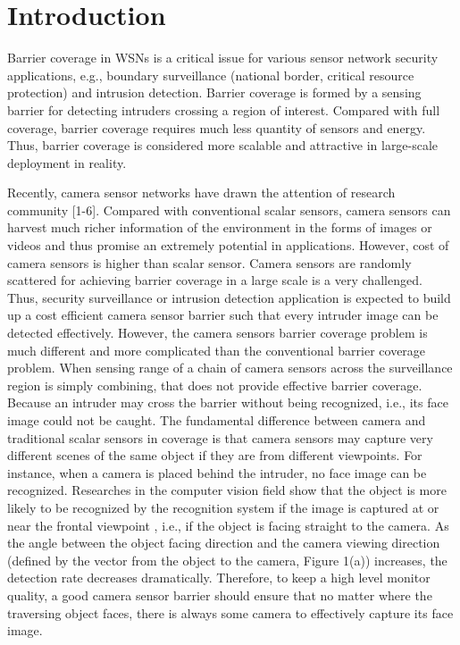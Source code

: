 \documentclass[3p]{elsarticle}
\begin{document}
\section{Introduction}
\label{sec:intro}
Barrier coverage in WSNs is a critical issue for various sensor network security applications, e.g., boundary surveillance (national border, critical resource protection) and intrusion detection. Barrier coverage is formed by a sensing barrier for detecting intruders crossing a region of interest. Compared with full coverage, barrier coverage requires much less quantity of sensors and energy. Thus, barrier coverage is considered more scalable and attractive in large-scale deployment in reality.\par
Recently, camera sensor networks have drawn the attention of research community [1-6]. Compared with conventional scalar sensors, camera sensors can harvest much richer information of the environment in the forms of images or videos and thus promise an extremely potential in applications. However, cost of camera sensors is higher than scalar sensor. Camera sensors are randomly scattered for achieving barrier coverage in a large scale is a very challenged. Thus, security surveillance or intrusion detection application is expected to build up a cost efficient camera sensor barrier such that every intruder image can be detected effectively. However, the camera sensors barrier coverage problem is much different and more complicated than the conventional barrier coverage problem. When sensing range of a chain of camera sensors across the surveillance region is simply combining, that does not provide effective barrier coverage. Because an intruder may cross the barrier without being recognized, i.e., its face image could not be caught. The fundamental difference between camera and traditional scalar sensors in coverage is that camera sensors may capture very different scenes of the same object if they are from different viewpoints. For instance, when a camera is placed behind the intruder, no face image can be recognized. Researches in the computer vision field show that the object is more likely to be recognized by the recognition system if the image is captured at or near the frontal viewpoint \cite{blanz2005face}, i.e., if the object is facing straight to the camera. As the angle between the object facing direction and the camera viewing direction (defined by the vector from the object to the camera, Figure 1(a)) increases, the detection rate decreases dramatically. Therefore, to keep a high level monitor quality, a good camera sensor barrier should ensure that no matter where the traversing object faces, there is always some camera to effectively capture its face image.\par
\end{document}
